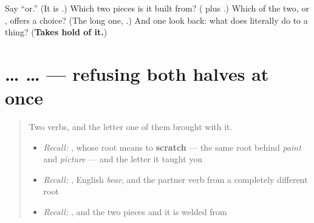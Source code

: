 \begin{tcolorbox}[breakable,colback=teal!4,colframe=teal!35!black,title={Before you move on}]
Say \textquotedblleft{}or.\textquotedblright{} (It is \textbf{}.) Which two pieces is it built from? (\textbf{} plus \textbf{}.) Which of the two, \textbf{} or \textbf{}, offers a choice? (The long one, \textbf{}.) And one look back: what does \emph{} literally do to a thing? (\textbf{Takes hold of it.})
\end{tcolorbox}
\section[\texorpdfstring{\ru{ни} … \ru{ни} … (ni … ni …)}{ни … ни … (ni … ni …)}]{ …  … — refusing both halves at once}

\label{lesson:RU-C16-ni-ni}



\begin{quote}
Two verbs, and the letter one of them brought with it.

\begin{itemize}
\raggedright
  \item \emph{Recall:} \emph{}, whose root means to \textbf{scratch} — the same root behind \emph{paint} and \emph{picture} — and the letter \textbf{} it taught you
  \item \emph{Recall:} \emph{}, English \emph{bear}, and the partner verb from a completely different root
  \item \emph{Recall:} \emph{}, and the two pieces \textbf{} and \textbf{} it is welded from
\end{itemize}
\end{quote}

